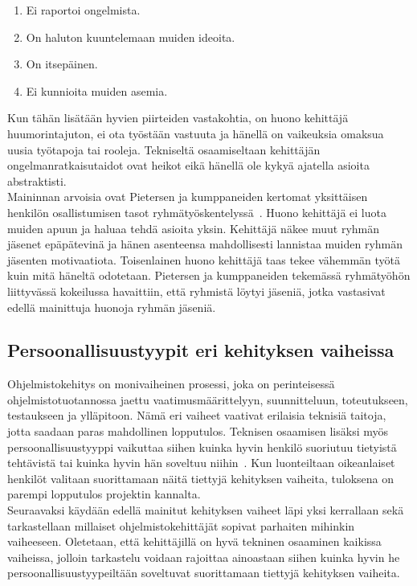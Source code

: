 \documentclass[finnish]{../tktltiki2}
\theoremstyle{definition}
\theoremstyle{remark}
\begin{document}
\begin{enumerate}

\item Ei raportoi ongelmista.
\item On haluton kuuntelemaan muiden ideoita.
\item On itsepäinen.
\item Ei kunnioita muiden asemia.

\end{enumerate}

Kun tähän lisätään hyvien piirteiden vastakohtia, on huono kehittäjä huumorintajuton, ei ota työstään vastuuta ja hänellä on vaikeuksia omaksua uusia työtapoja tai rooleja. Tekniseltä osaamiseltaan kehittäjän ongelmanratkaisutaidot ovat heikot eikä hänellä ole kykyä ajatella asioita abstraktisti.\\

Maininnan arvoisia ovat Pietersen ja kumppaneiden kertomat yksittäisen henkilön osallistumisen tasot ryhmä\-työskentelyssä~\cite{Pieterse:2012:PPS:2157136.2157218}.
Huono kehittäjä ei luota muiden apuun ja haluaa tehdä asioita yksin. Kehittäjä näkee muut ryhmän jäsenet epäpätevinä ja hänen asenteensa mahdollisesti lannistaa muiden ryhmän jäsenten motivaatiota. Toisenlainen huono kehittäjä taas tekee vähemmän työtä kuin mitä häneltä odotetaan.
Pietersen ja kumppaneiden tekemässä ryhmätyöhön liittyvässä kokeilussa havaittiin, että ryhmistä löytyi jäseniä, jotka vastasivat edellä mainittuja huonoja ryhmän jäseniä.

\subsection{Persoonallisuustyypit eri kehityksen vaiheissa}

Ohjelmistokehitys on monivaiheinen prosessi, joka on perinteisessä ohjelmistotuotannossa
jaettu vaatimusmäärittelyyn, suunnitteluun, toteutukseen, testaukseen
ja ylläpitoon. Nämä eri vaiheet vaativat erilaisia teknisiä taitoja,
jotta saadaan paras mahdollinen lopputulos. Teknisen
osaamisen lisäksi myös persoonallisuustyyppi vaikuttaa siihen kuinka
hyvin henkilö suoriutuu tietyistä tehtävistä tai kuinka hyvin hän
soveltuu niihin~\cite{Capretz:2010:MSS:1726559.1726574}. Kun luonteiltaan oikeanlaiset henkilöt valitaan suorittamaan
näitä tiettyjä kehityksen vaiheita, tuloksena on parempi lopputulos
projektin kannalta.\\

Seuraavaksi käydään edellä mainitut kehityksen vaiheet läpi yksi kerrallaan
sekä tarkastellaan millaiset ohjelmistokehittäjät sopivat
parhaiten mihinkin vaiheeseen. Oletetaan, että kehittäjillä on
hyvä tekninen osaaminen kaikissa vaiheissa, jolloin tarkastelu
voidaan rajoittaa ainoastaan siihen kuinka hyvin he persoonallisuustyypeiltään soveltuvat suorittamaan tiettyjä
kehityksen vaiheita.
\end{document}
